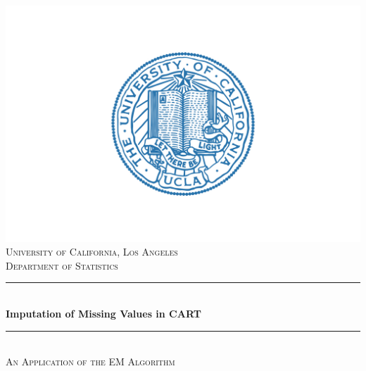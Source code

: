 \documentclass[12pt, twoside]{article}
\newcommand{\1}{\mathbb{1}}
\begin{document}
\begin{titlepage}

    \newcommand{\HRule}{\rule{\linewidth}{0.5mm}} %

    \center %
 
    \includegraphics[scale = 0.22]{campus-seal.jpg}\\[0.5cm]
    
     \textsc{\large University of California, Los Angeles}\\[0.2cm] %
     \textsc{\large Department of Statistics}\\[0.5cm]

    \HRule \\[0.4cm]
    { \huge \bfseries Imputation of Missing Values in CART}\\[0.2cm] %
    \HRule \\[0.4cm]
    \textsc{\large An Application of the EM Algorithm
    }\\[2.0 cm]
 
    

\end{titlepage}
\end{document}
